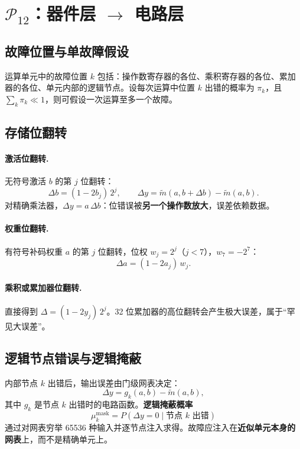 \documentclass[11pt,a4paper]{ctexart}
\begin{document}
\section{$\mathcal{P}_{12}$：器件层 $\to$ 电路层}

\subsection{故障位置与单故障假设}
运算单元中的故障位置 $k$ 包括：操作数寄存器的各位、乘积寄存器的各位、累加器的各位、单元内部的逻辑节点。设每次运算中位置 $k$ 出错的概率为 $\pi_k$，且 $\sum_k \pi_k \ll 1$，则可假设一次运算至多一个故障。

\subsection{存储位翻转}
\paragraph{激活位翻转.} 无符号激活 $b$ 的第 $j$ 位翻转：
\begin{equation}
\Delta b = (1 - 2b_j)\,2^j,\qquad
\Delta y = \tilde m(a, b + \Delta b) - \tilde m(a, b).
\end{equation}
对精确乘法器，$\Delta y = a\,\Delta b$：位错误被\textbf{另一个操作数放大}，误差依赖数据。

\paragraph{权重位翻转.} 有符号补码权重 $a$ 的第 $j$ 位翻转，位权 $w_j = 2^j$（$j<7$），$w_7 = -2^7$：
\begin{equation}
\Delta a = (1 - 2a_j)\,w_j .
\end{equation}

\paragraph{乘积或累加器位翻转.} 直接得到 $\Delta = (1 - 2y_j)\,2^j$。32 位累加器的高位翻转会产生极大误差，属于“罕见大误差”。

\subsection{逻辑节点错误与逻辑掩蔽}
内部节点 $k$ 出错后，输出误差由门级网表决定：
\begin{equation}
\Delta y = g_k(a,b) - \tilde m(a,b),
\end{equation}
其中 $g_k$ 是节点 $k$ 出错时的电路函数。\textbf{逻辑掩蔽概率}
\begin{equation}
\mu^{\text{mask}}_k = P(\Delta y = 0 \mid \text{节点 } k \text{ 出错})
\end{equation}
通过对网表穷举 65536 种输入并逐节点注入求得。故障应注入在\textbf{近似单元本身的网表}上，而不是精确单元上。
\end{document}

